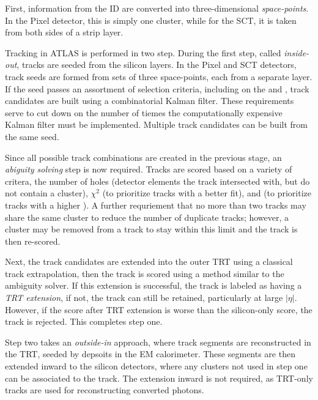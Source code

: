 First, information from the \ac{ID} are converted into three-dimensional \emph{space-points}. In the Pixel detector, this is simply one cluster, while for the \ac{SCT}, it is taken from both sides of a strip layer.

Tracking in ATLAS is performed in two step. During the first step, called \emph{inside-out}, tracks are seeded from the silicon layers. In the Pixel and \ac{SCT} detectors, track seeds are formed from sets of three space-points, each from a separate layer. If the seed passes an assortment of selection criteria, including on the \pt and \dzero, track candidates are built using a combinatorial Kalman filter. These requirements serve to cut down on the number of tiemes the computationally expensive Kalman filter must be implemented. Multiple track candidates can be built from the same seed.


Since all possible track combinations are created in the previous stage, an \emph{abiguity solving} step is now required. Tracks are scored based on a variety of critera, the number of holes (detector elements the track intersected with, but do not contain a cluster), $\chi^{2}$ (to prioritize tracks with a better fit), and \pt (to prioritize tracks with a higher \pt). A further requriement that no more than two tracks may share the same cluster to reduce the number of duplicate tracks; however, a cluster may be removed from a track to stay within this limit and the track is then re-scored. 

Next, the track candidates are extended into the outer \ac{TRT} using a classical track extrapolation, then the track is scored using a method similar to the ambiguity solver. If this extension is successful, the track is labeled as having a \emph{\ac{TRT} extension}, if not, the track can still be retained, particularly at large $|\eta|$. However, if the score after TRT extension is worse than the silicon-only score, the track is rejected. This completes step one.



Step two takes an \emph{outside-in} approach, where track segments are reconstructed in the \ac{TRT}, seeded by depsoits in the \ac{EM} calorimeter. These segments are then extended inward to the silicon detectors, where any clusters not used in step one can be associated to the track. The extension inward is not required, as \ac{TRT}-only tracks are used for reconstructing converted photons. 



